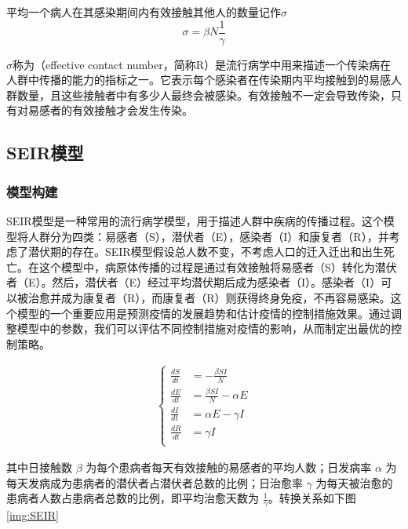 平均一个病人在其感染期间内有效接触其他人的数量记作$\sigma$
$$\sigma=\beta N \frac{1}{\gamma}$$

$\sigma$称为（effective contact number，简称R）是流行病学中用来描述一个传染病在人群中传播的能力的指标之一。它表示每个感染者在传染期内平均接触到的易感人群数量，且这些接触者中有多少人最终会被感染。有效接触不一定会导致传染，只有对易感者的有效接触才会发生传染。

\subsection{SEIR模型}
\subsubsection{模型构建}
SEIR模型是一种常用的流行病学模型，用于描述人群中疾病的传播过程。这个模型将人群分为四类：易感者（S），潜伏者（E），感染者（I）和康复者（R），并考虑了潜伏期的存在。SEIR模型假设总人数不变，不考虑人口的迁入迁出和出生死亡。在这个模型中，病原体传播的过程是通过有效接触将易感者（S）转化为潜伏者（E）。然后，潜伏者（E）经过平均潜伏期后成为感染者（I）。感染者（I）可以被治愈并成为康复者（R），而康复者（R）则获得终身免疫，不再容易感染。这个模型的一个重要应用是预测疫情的发展趋势和估计疫情的控制措施效果。通过调整模型中的参数，我们可以评估不同控制措施对疫情的影响，从而制定出最优的控制策略。

\begin{gather}
\left\{
\begin{aligned}
\frac{dS}{dt} & =  -\frac{\beta SI}{N} \\
\frac{dE}{dt} & =  \frac{\beta SI}{N} - \alpha E\\
\frac{dI}{dt} & =  \alpha E - \gamma I \\
\frac{dR}{dt} & =  \gamma I \\
\end{aligned}
\right.
\label{equal:SEIR}
\end{gather}

其中日接触数 $\beta$ 为每个患病者每天有效接触的易感者的平均人数；日发病率 $\alpha$ 为每天发病成为患病者的潜伏者占潜伏者总数的比例；日治愈率 $\gamma$ 为每天被治愈的患病者人数占患病者总数的比例，即平均治愈天数为 $\frac{1}{\gamma}$。转换关系如下图\ref{img:SEIR}

